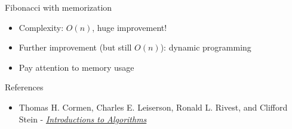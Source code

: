 \documentclass[11pt]{beamer}
\begin{document}
\begin{frame}{Fibonacci with memorization}
	\begin{itemize}
		\item Complexity: $O(n)$, huge improvement!
		\item Further improvement (but still $O(n)$): dynamic programming
		\item Pay attention to memory usage
	\end{itemize}
\end{frame}

\begin{frame}{References}
	\begin{itemize}
	\item Thomas H. Cormen, Charles E. Leiserson, Ronald L. Rivest, and
		Clifford Stein - 
		\href{https://en.wikipedia.org/wiki/Introduction\_to\_Algorithms}%
		{\emph{Introductions to Algorithms}}
	\end{itemize}
\end{frame}
\end{document}
